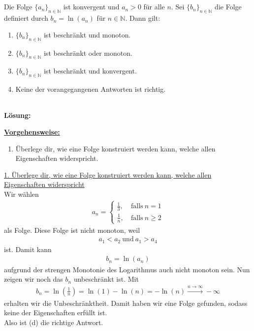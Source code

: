 \subsection*{}
Die Folge $\lbrace a_n \rbrace_{n \in \mathbb{N}}$ ist konvergent und $a_n > 0$
für alle $n$.
Sei $\lbrace b_n \rbrace_{n \in \mathbb{N}}$ die Folge definiert durch
$b_n = \ln(a_n)$ für $n \in \mathbb{N}$.
Dann gilt:\\

\renewcommand{\labelenumi}{(\alph{enumi})}
\begin{enumerate}
\item $\lbrace b_n \rbrace_{n \in \mathbb{N}}$ ist beschränkt und monoton.
\item $\lbrace b_n \rbrace_{n \in \mathbb{N}}$ ist beschränkt oder monoton.
\item $\lbrace b_n \rbrace_{n \in \mathbb{N}}$ ist beschränkt und konvergent.
\item Keine der vorangegangenen Antworten ist richtig.
\end{enumerate}

\ \\
\textbf{Lösung:}
\begin{mdframed}
\underline{\textbf{Vorgehensweise:}}
\renewcommand{\labelenumi}{\theenumi.}
\begin{enumerate}
\item Überlege dir, wie eine Folge konstruiert werden kann, welche allen Eigenschaften widerspricht. 
\end{enumerate}
\end{mdframed}

\underline{1. Überlege dir, wie eine Folge konstruiert werden kann, welche allen Eigenschaften widerspricht}\\
Wir wählen 
\begin{align*}
a_n =
\begin{cases}
\frac{1}{3}, &\ \text{falls} \ n = 1 \\
\frac{1}{n}, &\ \text{falls} \ n \geq 2
\end{cases}
\end{align*}
als Folge. Diese Folge ist nicht monoton, weil
\begin{align*}
a_1 < a_2 \ \text{und} \ a_1 > a_4
\end{align*}
ist. Damit kann 
\begin{align*}
b_n = \ln(a_n)
\end{align*}
aufgrund der strengen Monotonie des Logarithmus auch nicht monoton sein.
Nun zeigen wir noch das $b_n$ unbeschränkt ist.
Mit 
\begin{align*}
b_n = \ln\left( \frac{1}{n} \right) = \ln(1) - \ln(n) = - \ln(n)
\stackrel{n \rightarrow \infty}{\rightarrow } -\infty
\end{align*}
erhalten wir die Unbeschränktheit.
Damit haben wir eine Folge gefunden, sodass keine der Eigenschaften erfüllt ist.\\
Also ist (d) die richtige Antwort.


